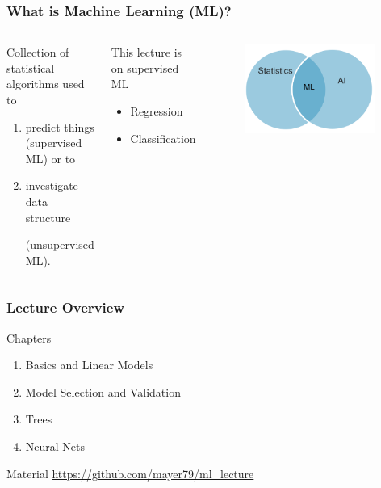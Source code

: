 \documentclass[
    utf8,
    aspectratio=169
]{beamer}  %
\begin{document}
\begin{frame}
	\frametitle{What is Machine Learning (ML)?}
	\begin{columns}
		\begin{block}{Collection of statistical algorithms used to}
			\begin{enumerate}
				\item predict things (supervised ML) or to
				\item investigate data structure 
				
				(unsupervised ML).
			\end{enumerate}
		\end{block}	
		\begin{block}{This lecture is on supervised ML}
			\begin{itemize}
				\item Regression
				\item Classification
			\end{itemize}
		\end{block}
		\begin{figure}
			\includegraphics[width=0.95\textwidth]{pics/ml.png}
		\end{figure}
	\end{columns}
\end{frame}

\begin{frame}
	\frametitle{Lecture Overview}
	\begin{block}{Chapters}
		\begin{enumerate}
			\item Basics and Linear Models
			\item Model Selection and Validation
			\item Trees
			\item Neural Nets
		\end{enumerate}
	\end{block}
	
	\begin{block}{Material}
		\url{https://github.com/mayer79/ml\_lecture}
	\end{block}
\end{frame}
\end{document}
